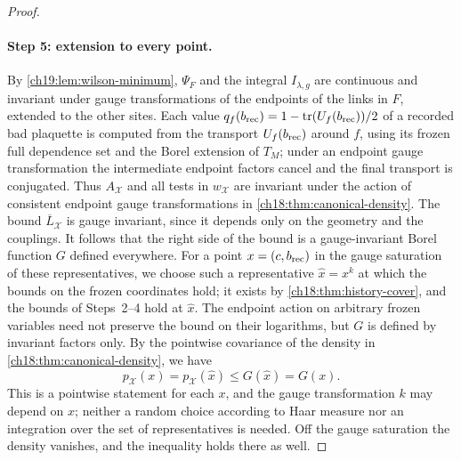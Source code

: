 \begin{proof}
\paragraph{Step 5: extension to every point.}
By \cref{ch19:lem:wilson-minimum}, $\Psi_F$ and the integral $I_{\lambda,g}$ are continuous and invariant under gauge transformations of the endpoints of the links in $F$, extended to the other sites. Each value $q_f(b_{\mathrm{rec}})=1-\operatorname{tr}(U_f(b_{\mathrm{rec}}))/2$ of a recorded bad plaquette is computed from the transport $U_f(b_{\mathrm{rec}})$ around $f$, using its frozen full dependence set and the Borel extension of $T_M$; under an endpoint gauge transformation the intermediate endpoint factors cancel and the final transport is conjugated. Thus $A_{\mathcal X}$ and all tests in $w_{\mathcal X}$ are invariant under the action of consistent endpoint gauge transformations in \cref{ch18:thm:canonical-density}. The bound $\overline L_{\mathcal X}$ is gauge invariant, since it depends only on the geometry and the couplings. It follows that the right side of the bound is a gauge-invariant Borel function $G$ defined everywhere. For a point $x=(c,b_{\mathrm{rec}})$ in the gauge saturation of these representatives, we choose such a representative $\widehat x=x^k$ at which the bounds on the frozen coordinates hold; it exists by \cref{ch18:thm:history-cover}, and the bounds of Steps~2--4 hold at $\widehat x$. The endpoint action on arbitrary frozen variables need not preserve the bound on their logarithms, but $G$ is defined by invariant factors only. By the pointwise covariance of the density in \cref{ch18:thm:canonical-density}, we have
\[
 p_{\mathcal X}(x)=p_{\mathcal X}(\widehat x)\le G(\widehat x)=G(x).
\]
This is a pointwise statement for each $x$, and the gauge transformation $k$ may depend on $x$; neither a random choice according to Haar measure nor an integration over the set of representatives is needed. Off the gauge saturation the density vanishes, and the inequality holds there as well.


\end{proof}

